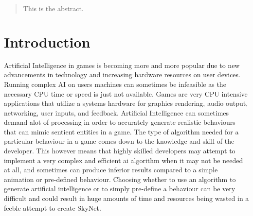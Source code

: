\documentclass[12pt,a4paper,titlepage]{article}
\begin{document}


\begin{abstract}
This is the abstract.
\end{abstract}

\tableofcontents

\newpage

\listoftables

\newpage

\listoffigures

\newpage

\section{Introduction}

Artificial Intelligence in games is becoming more and more popular due to new advancements in technology and increasing hardware resources on user devices. Running complex AI on users machines can sometimes be infeasible as the necessary CPU time or speed is just not available. Games are very CPU intensive applications that utilize a systems hardware for graphics rendering, audio output, networking, user inputs, and feedback. Artificial Intelligence can sometimes demand alot of processing in order to accurately generate realistic behaviours that can mimic sentient entities in a game. The type of algorithm needed for a particular behaviour in a game comes down to the knowledge and skill of the developer. This however means that highly skilled developers may attempt to implement a very complex and efficient ai algorithm when it may not be needed at all, and sometimes can produce inferior results compared to a simple animation or pre-defined behaviour. Choosing whether to use an algorithm to generate artificial intelligence or to simply pre-define a behaviour can be very difficult and could result in huge amounts of time and resources being wasted in a feeble attempt to create SkyNet\cite{skynet}. 
\end{document}
